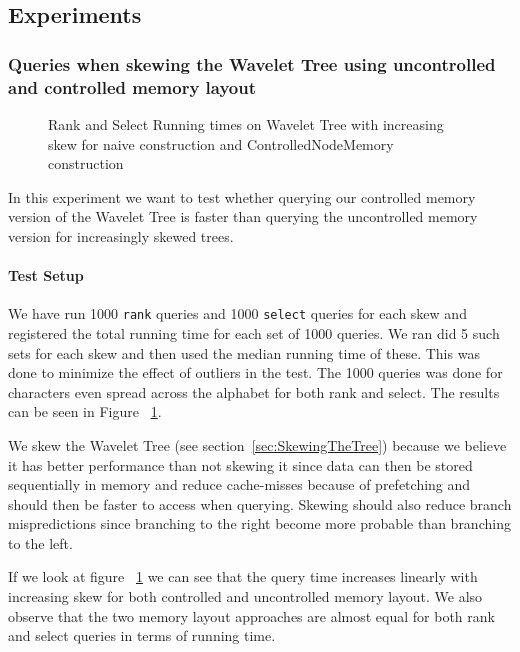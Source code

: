 \subsection{Experiments}

\subsubsection{Queries when skewing the Wavelet Tree using uncontrolled and controlled memory layout}

\begin{figure}
\caption{Rank and Select Running times on Wavelet Tree with increasing skew for naive construction and ControlledNodeMemory construction}
\label{fig:NaiveRankSelectSkewRunningTime}

\end{figure}


In this experiment we want to test whether querying our controlled memory version of the Wavelet Tree is faster than querying the uncontrolled memory version for increasingly skewed trees. 

\paragraph{Test Setup}
We have run 1000 \texttt{rank} queries and 1000 \texttt{select} queries for each skew and registered the total running time for each set of 1000 queries. 
We ran did 5 such sets for each skew and then used the median running time of these. 
This was done to minimize the effect of outliers in the test. The 1000 queries was done for characters even spread across the alphabet for both rank and select. The results can be seen in Figure ~\ref{fig:NaiveRankSelectSkewRunningTime}.

We skew the Wavelet Tree (see section~\ref{sec:SkewingTheTree}) because we believe it has better performance than not skewing it since data can then be stored sequentially in memory and reduce cache-misses because of prefetching and should then be faster to access when querying. %
Skewing should also reduce branch mispredictions since branching to the right become more probable than branching to the left. 

If we look at figure ~\ref{fig:NaiveRankSelectSkewRunningTime} we can see that the query time increases linearly with increasing skew for both controlled and uncontrolled memory layout. We also observe that the two memory layout approaches are almost equal for both rank and select queries in terms of running time.

